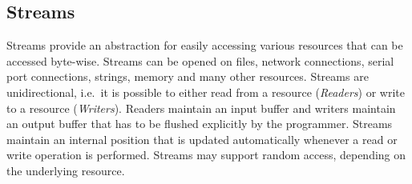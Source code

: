 \documentclass[a4paper,11pt]{article}
\begin{document}
\subsection{Streams}
Streams provide an abstraction for easily accessing various resources that can be accessed byte-wise. Streams can be opened on files, network connections, serial port connections, strings, memory and many other resources.
Streams are unidirectional, i.e.\ it is possible to either read from a resource (\emph{Readers}) or write to a resource (\emph{Writers}). Readers maintain an input buffer and writers maintain an output buffer that has to be flushed explicitly by the programmer.
Streams maintain an internal position that is updated automatically whenever a read or write operation is performed. Streams may support random access, depending on the underlying resource.
\end{document}
